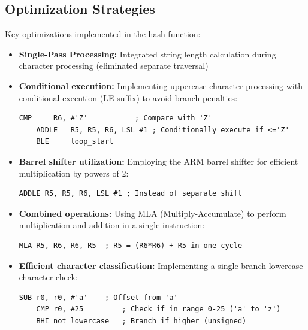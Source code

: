 \documentclass[a4paper,12pt]{article}
\newenvironment{sectionbox}[1]{%
    \tcolorbox[
        colback=titleblue!5,
        colframe=titleblue!50,
        arc=3mm,
        title=#1,
        fonttitle=\bfseries\sffamily,
        before skip=1.2em,
        after skip=1.2em
    ]
}{\endtcolorbox}
\begin{document}
\begin{sectionbox}{Optimization Techniques}

\subsection*{Optimization Strategies}

Key optimizations implemented in the hash function:

\begin{itemize}[leftmargin=2em]
    
    \item \textbf{Single-Pass Processing:} Integrated string length calculation during character processing (eliminated separate traversal)
    
    \item \textbf{Conditional execution:} Implementing uppercase character processing with conditional execution (LE suffix) to avoid branch penalties:
    \begin{lstlisting}[language={[x86masm]Assembler}]
    CMP     R6, #'Z'           ; Compare with 'Z'
    ADDLE   R5, R5, R6, LSL #1 ; Conditionally execute if <='Z'
    BLE     loop_start
    \end{lstlisting}
    
    \item \textbf{Barrel shifter utilization:} Employing the ARM barrel shifter for efficient multiplication by powers of 2:
    \begin{lstlisting}[language={[x86masm]Assembler}]
    ADDLE R5, R5, R6, LSL #1 ; Instead of separate shift
    \end{lstlisting}
    
    \item \textbf{Combined operations:} Using MLA (Multiply-Accumulate) to perform multiplication and addition in a single instruction:
    \begin{lstlisting}[language={[x86masm]Assembler}]
    MLA R5, R6, R6, R5  ; R5 = (R6*R6) + R5 in one cycle
    \end{lstlisting}
    
    \item \textbf{Efficient character classification:} Implementing a single-branch lowercase character check:
    \begin{lstlisting}[language={[x86masm]Assembler}]
    SUB r0, r0, #'a'    ; Offset from 'a'
    CMP r0, #25         ; Check if in range 0-25 ('a' to 'z')
    BHI not_lowercase   ; Branch if higher (unsigned)
    \end{lstlisting}    


\end{itemize}
\end{sectionbox}
\end{document}
